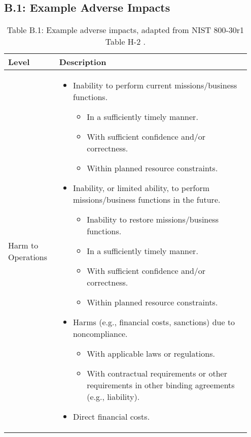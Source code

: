 \documentclass[fleqn]{article}
\begin{document}
\subsection*{B.1: Example Adverse Impacts}

\begin{table}[H]
    \caption*{Table B.1: Example adverse impacts, adapted from NIST 800-30r1 Table H-2 \cite{nist80030r1}.}
    \footnotesize
        \begin{tabular}{|m{0.20\linewidth} | m{0.75\linewidth}|}
            \hline
            \textbf{Level} & \textbf{Description} \\ \hline
            Harm to Operations & 
            \begin{itemize}[noitemsep]
           		\item Inability to perform current missions/business functions.
           		\begin{itemize}[noitemsep,nolistsep]
           			\item In a sufficiently timely manner.
           			\item With sufficient confidence and/or correctness.
           			\item Within planned resource constraints.
           		\end{itemize}
           		\item Inability, or limited ability, to perform missions/business functions in the future.           	
           		\begin{itemize}[noitemsep,nolistsep]
           			\item Inability to restore missions/business functions.
           			\item In a sufficiently timely manner.
					\item With sufficient confidence and/or correctness.
					\item Within planned resource constraints.
           		\end{itemize}
           		\item Harms (e.g., financial costs, sanctions) due to noncompliance. 
           		\begin{itemize}[noitemsep,nolistsep]
           			\item With applicable laws or regulations.
           			\item With contractual requirements or other requirements in other binding agreements (e.g., liability).
           		\end{itemize}
           		\item Direct financial costs.

\end{itemize}
\end{tabular}
\end{table}
\end{document}
